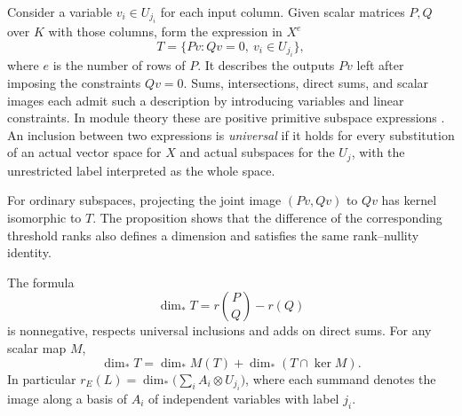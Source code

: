Consider a variable $v_i\in U_{j_i}$ for each input column. Given
scalar matrices $P,Q$ over $K$ with those columns, form the expression
in $X^e$
\[
 T=\{Pv: Qv=0,\ v_i\in U_{j_i}\},
\]
where $e$ is the number of rows of $P$. It describes the outputs $Pv$
left after imposing the constraints $Qv=0$. Sums, intersections,
direct sums, and scalar images each admit such a description by
introducing variables and linear constraints. In module theory these
are positive primitive subspace expressions \cite{Prest}. An inclusion
between two expressions is \emph{universal} if it holds for every
substitution of an actual vector space for $X$ and actual subspaces for
the $U_j$, with the unrestricted label interpreted as the whole space.

For ordinary subspaces, projecting the joint image $(Pv,Qv)$ to $Qv$
has kernel isomorphic to $T$. The proposition shows that the difference
of the corresponding threshold ranks also defines a dimension and
satisfies the same rank--nullity identity.

\begin{proposition}\label{flag:dimension}
The formula
\begin{equation}\label{flag:ppdim}
 \dim_*T=r\!\binom{P}{Q}-r(Q)
\end{equation}
is nonnegative, respects universal inclusions and adds on direct sums.
For any scalar map $M$,
\[
 \dim_*T=\dim_*M(T)+\dim_*(T\cap\ker M).
\]
In particular $r_E(L)=\dim_*\big(\sum_i A_i\otimes U_{j_i}\big)$, where
each summand denotes the image along a basis of $A_i$ of independent
variables with label $j_i$.
\end{proposition}

